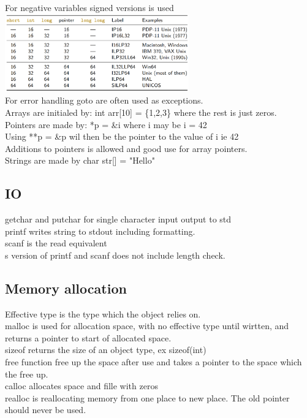 \documentclass[12pt, a4paper]{article}
\begin{document}
		For negative variables signed versions is used\\
		\includegraphics[width=300px]{assets/cDataSize.png}\\
		For error handling goto are often used as exceptions.\\
		Arrays are initialed by: int arr[10] = \{1,2,3\} where the rest is just zeros.\\
		Pointers are made by: *p = \&i where i may be i = 42\\
		Using **p = \&p wil then be the pointer to the value of i ie 42\\
		Additions to pointers is allowed and good use for array pointers.\\
		Strings are made by char str[] = "Hello"
		\subsection{IO}
			getchar and putchar for single character input output to std\\
			printf writes string to stdout including formatting.\\
			scanf is the read equivalent\\
			s version of printf and scanf does not include length check.\\
		\subsection{Memory allocation}
			Effective type is the type which the object relies on.\\
			malloc is used for allocation space, with no effective type until wirtten, and returns a pointer to start of allocated space.\\
			sizeof returns the size of an object type, ex sizeof(int)\\
			free function free up the space after use and takes a pointer to the space which the free up.\\
			calloc allocates space and fille with zeros\\
			realloc is reallocating memory from one place to new place. The old pointer should never be used.\\
\end{document}
